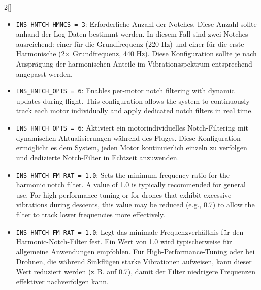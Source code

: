 \begin{paracol}{2}[]
\colger

\begin{itemize}
\item \texttt{INS\_HNTCH\_HMNCS = 3}: Erforderliche Anzahl der Notches. Diese Anzahl sollte anhand der Log-Daten bestimmt werden. In diesem Fall sind zwei Notches ausreichend: einer für die Grundfrequenz (220 Hz) und einer für die erste Harmonische (2× Grundfrequenz, 440 Hz). Diese Konfiguration sollte je nach Ausprägung der harmonischen Anteile im Vibrationsspektrum entsprechend angepasst werden.
\end{itemize}

\coleng

\begin{itemize}
\item \texttt{INS\_HNTCH\_OPTS = 6}: Enables per-motor notch filtering with dynamic updates during flight. This configuration allows the system to continuously track each motor individually and apply dedicated notch filters in real time.
\end{itemize}

\colger

\begin{itemize}
\item \texttt{INS\_HNTCH\_OPTS = 6}: Aktiviert ein motorindividuelles Notch-Filtering mit dynamischen Aktualisierungen während des Fluges. Diese Konfiguration ermöglicht es dem System, jeden Motor kontinuierlich einzeln zu verfolgen und dedizierte Notch-Filter in Echtzeit anzuwenden.
\end{itemize}

\coleng

\begin{itemize}
\item \texttt{INS\_HNTCH\_FM\_RAT = 1.0}: Sets the minimum frequency ratio for the harmonic notch filter. A value of 1.0 is typically recommended for general use. For high-performance tuning or for drones that exhibit excessive vibrations during descents, this value may be reduced (e.g., 0.7) to allow the filter to track lower frequencies more effectively.
\end{itemize}

\colger

\begin{itemize}
\item \texttt{INS\_HNTCH\_FM\_RAT = 1.0}: Legt das minimale Frequenzverhältnis für den Harmonic-Notch-Filter fest. Ein Wert von 1.0 wird typischerweise für allgemeine Anwendungen empfohlen. Für High-Performance-Tuning oder bei Drohnen, die während Sinkflügen starke Vibrationen aufweisen, kann dieser Wert reduziert werden (z.\,B. auf 0.7), damit der Filter niedrigere Frequenzen effektiver nachverfolgen kann.
\end{itemize}


\end{paracol}
